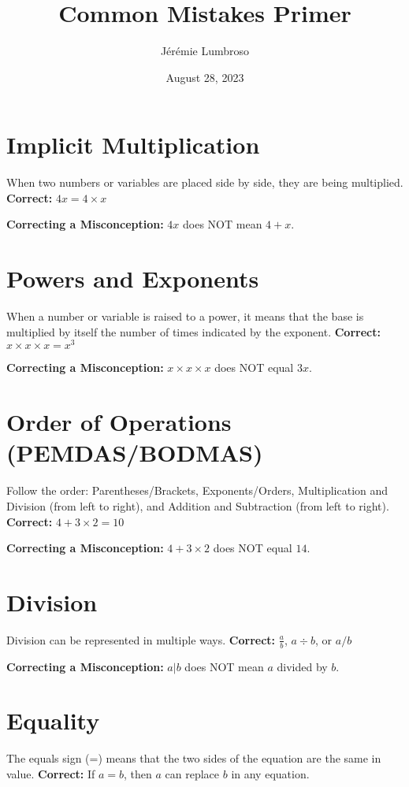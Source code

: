 \documentclass[12pt]{article}
\title{Common Mistakes Primer}
\author{Jérémie Lumbroso}
\date{August 28, 2023}
\begin{document}
\maketitle

\section*{Implicit Multiplication}
When two numbers or variables are placed side by side, they are being multiplied.
\textbf{Correct:} \(4x = 4 \times x\)

\textbf{Correcting a Misconception:} \(4x\) does NOT mean \(4 + x\).

\section*{Powers and Exponents}
When a number or variable is raised to a power, it means that the base is multiplied by itself the number of times indicated by the exponent.
\textbf{Correct:} \(x \times x \times x = x^3\)

\textbf{Correcting a Misconception:} \(x \times x \times x\) does NOT equal \(3x\).

\section*{Order of Operations (PEMDAS/BODMAS)}
Follow the order: Parentheses/Brackets, Exponents/Orders, Multiplication and Division (from left to right), and Addition and Subtraction (from left to right).
\textbf{Correct:} \(4 + 3 \times 2 = 10\)

\textbf{Correcting a Misconception:} \(4 + 3 \times 2\) does NOT equal \(14\).

\section*{Division}
Division can be represented in multiple ways.
\textbf{Correct:} \(\frac{a}{b}\), \(a \div b\), or \(a/b\)

\textbf{Correcting a Misconception:} \(a|b\) does NOT mean \(a\) divided by \(b\).

\section*{Equality}
The equals sign (=) means that the two sides of the equation are the same in value.
\textbf{Correct:} If \(a = b\), then \(a\) can replace \(b\) in any equation.
\end{document}
